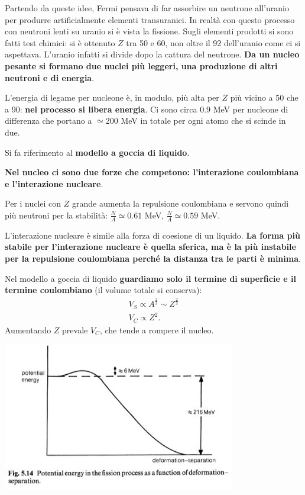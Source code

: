 \documentclass[a4paper,11pt,twoside,openany]{book}
\theoremstyle{definition}
\theoremstyle{plain}
\theoremstyle{plain}
\theoremstyle{definition}
\begin{document}
Partendo da queste idee, Fermi pensava di far assorbire un neutrone all'uranio per produrre artificialmente elementi transuranici. In realtà con questo processo con neutroni lenti su uranio si è vista la fissione. Sugli elementi prodotti si sono fatti test chimici: si è ottenuto $Z$ tra 50 e 60, non oltre il 92 dell'uranio come ci si aspettava. L'uranio infatti si divide dopo la cattura del neutrone. \textbf{Da un nucleo pesante si formano due nuclei più leggeri, una produzione di altri neutroni e di energia}.

L'energia di legame per nucleone è, in modulo, più alta per $Z$ più vicino a 50 che a 90: \textbf{nel processo si libera energia}. Ci sono circa 0.9 MeV per nucleone di differenza che portano a $\simeq$\si{200}{ MeV} in totale per ogni atomo che si scinde in due.

Si fa riferimento al \textbf{modello a goccia di liquido}.

\textbf{Nel nucleo ci sono due forze che competono: l'interazione coulombiana e l'interazione nucleare}.

Per i nuclei con $Z$ grande aumenta la repulsione coulombiana e servono quindi più neutroni per la stabilità:  $\frac{N}{A}\simeq 0.61$ MeV,  $\frac{N}{A}\simeq 0.59$ MeV.

L'interazione nucleare è simile alla forza di coesione di un liquido. \textbf{La forma più stabile per l'interazione nucleare è quella sferica, ma è la più instabile per la repulsione coulombiana perché la distanza tra le parti è minima}.

Nel modello a goccia di liquido \textbf{guardiamo solo il termine di superficie e il termine coulombiano} (il volume totale si conserva):
\begin{equation}\begin{split}
V_{S} \propto A^{\frac{2}{3}} \sim Z^{\frac{2}{3}} \\
V_{C}\propto Z^2.
\end{split}\end{equation}
Aumentando $Z$ prevale $V_C$, che tende a rompere il nucleo.

\begin{center}
\includegraphics[width=4in]{immagini/pot_fission.jpg} %
\end{center}
\end{document}
